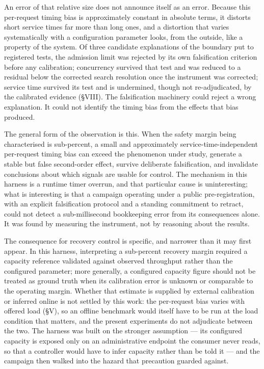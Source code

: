 \documentclass{ieeeaccess}
\begin{document}
An error of that relative size does not announce itself as an error. Because this per-request timing bias is approximately constant in absolute terms, it distorts short service times far more than long ones, and a distortion that varies systematically with a configuration parameter looks, from the outside, like a property of the system. Of three candidate explanations of the boundary put to registered tests, the admission limit was rejected by its own falsification criterion before any calibration; concurrency survived that test and was reduced to a residual below the corrected search resolution once the instrument was corrected; service time survived its test and is undermined, though not re-adjudicated, by the calibrated evidence (\S{}VIII). The falsification machinery could reject a wrong explanation. It could not identify the timing bias from the effects that bias produced.

The general form of the observation is this. When the safety margin being characterised is sub-percent, a small and approximately service-time-independent per-request timing bias can exceed the phenomenon under study, generate a stable but false second-order effect, survive deliberate falsification, and invalidate conclusions about which signals are usable for control. The mechanism in this harness is a runtime timer overrun, and that particular cause is uninteresting; what is interesting is that a campaign operating under a public pre-registration, with an explicit falsification protocol and a standing commitment to retract, could not detect a sub-millisecond bookkeeping error from its consequences alone. It was found by measuring the instrument, not by reasoning about the results.

The consequence for recovery control is specific, and narrower than it may first appear. In this harness, interpreting a sub-percent recovery margin required a capacity reference validated against observed throughput rather than the configured parameter; more generally, a configured capacity figure should not be treated as ground truth when its calibration error is unknown or comparable to the operating margin. Whether that estimate is supplied by external calibration or inferred online is not settled by this work: the per-request bias varies with offered load (\S{}V), so an offline benchmark would itself have to be run at the load condition that matters, and the present experiments do not adjudicate between the two. The harness was built on the stronger assumption --- its configured capacity is exposed only on an administrative endpoint the consumer never reads, so that a controller would have to infer capacity rather than be told it --- and the campaign then walked into the hazard that precaution guarded against.
\end{document}

